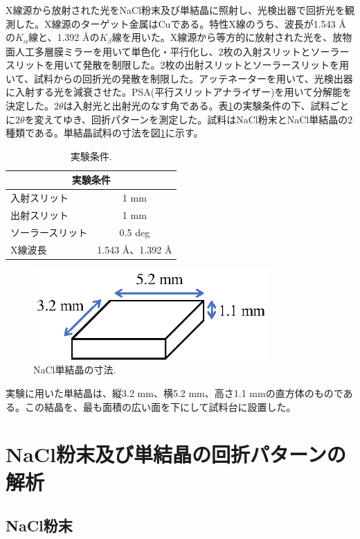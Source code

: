 \documentclass[11pt,a4j,uplatex]{jsarticle}
\begin{document}
X線源から放射された光をNaCl粉末及び単結晶に照射し、光検出器で回折光を観測した。X線源のターゲット金属はCuである。特性X線のうち、波長が1.543 \AA の$K_\alpha$線と、1.392 \AA の$K_\beta$線を用いた。X線源から等方的に放射された光を、放物面人工多層膜ミラーを用いて単色化・平行化し、2枚の入射スリットとソーラースリットを用いて発散を制限した。2枚の出射スリットとソーラースリットを用いて、試料からの回折光の発散を制限した。アッテネーターを用いて、光検出器に入射する光を減衰させた。PSA(平行スリットアナライザー)を用いて分解能を決定した。$2\theta$は入射光と出射光のなす角である。表\ref{exp}の実験条件の下、試料ごとに$2\theta$を変えてゆき、回折パターンを測定した。試料はNaCl粉末とNaCl単結晶の2種類である。単結晶試料の寸法を図\ref{size}に示す。

\begin{table}[ht]
 \centering
 \caption{実験条件.}
 \begin{tabular}{lc}\hline
  \multicolumn{2}{c}{実験条件}            \\ \hline
  入射スリット     & 1 mm                 \\
  出射スリット     & 1 mm                 \\
  ソーラースリット & 0.5 deg              \\
  X線波長          & 1.543 \AA、1.392 \AA \\\hline
 \end{tabular}
 \label{exp}
\end{table}

\begin{figure}[htb]
 \centering
 \includegraphics[clip,width=9cm]{bulk.eps}
 \caption{NaCl単結晶の寸法.}
 \label{size}
\end{figure}


\newpage
実験に用いた単結晶は、縦3.2 mm、横5.2 mm、高さ1.1 mmの直方体のものである。この結晶を、最も面積の広い面を下にして試料台に設置した。

\newpage
\section{NaCl粉末及び単結晶の回折パターンの解析}


\subsection{NaCl粉末}
\end{document}
